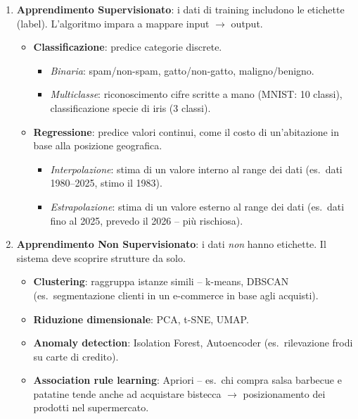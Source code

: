 \begin{enumerate}
    \item \textbf{Apprendimento Supervisionato}: i dati di training includono le etichette (label). L'algoritmo impara a mappare input $\to$ output.

    \begin{itemize}
        \item \textbf{Classificazione}: predice categorie discrete.
        \begin{itemize}
            \item \emph{Binaria}: spam/non-spam, gatto/non-gatto, maligno/benigno.
            \item \emph{Multiclasse}: riconoscimento cifre scritte a mano (MNIST: 10 classi), classificazione specie di iris (3 classi).
        \end{itemize}
        \item \textbf{Regressione}: predice valori continui, come il costo di un'abitazione in base alla posizione geografica.
        \begin{itemize}
            \item \emph{Interpolazione}: stima di un valore interno al range dei dati (es.\ dati 1980--2025, stimo il 1983).
            \item \emph{Estrapolazione}: stima di un valore esterno al range dei dati (es.\ dati fino al 2025, prevedo il 2026 -- più rischiosa).
        \end{itemize}
    \end{itemize}

    \item \textbf{Apprendimento Non Supervisionato}: i dati \emph{non} hanno etichette. Il sistema deve scoprire strutture da solo.
    \begin{itemize}
        \item \textbf{Clustering}: raggruppa istanze simili -- k-means, DBSCAN (es.\ segmentazione clienti in un e-commerce in base agli acquisti).
        \item \textbf{Riduzione dimensionale}: PCA, t-SNE, UMAP.
        \item \textbf{Anomaly detection}: Isolation Forest, Autoencoder (es.\ rilevazione frodi su carte di credito).
        \item \textbf{Association rule learning}: Apriori -- es.\ chi compra salsa barbecue e patatine tende anche ad acquistare bistecca $\to$ posizionamento dei prodotti nel supermercato.
    \end{itemize}


\end{enumerate}
